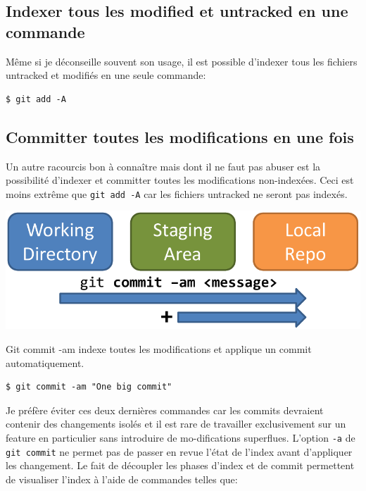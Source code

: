 \documentclass{../../common/tufte-latex/tufte-handout}
\begin{document}
\subsection{Indexer tous les modified et untracked en une commande}

Même si je déconseille souvent son usage, il est possible d'indexer tous les fichiers untracked et modifiés en une seule commande:

\begin{lstlisting}[style=BashInputStyle]
  $ git add -A
\end{lstlisting}

\subsection{Committer toutes les modifications en une fois}

Un autre racourcis bon à connaître mais dont il ne faut pas abuser est la possibilité d'indexer et committer toutes les modifications non-indexées. Ceci est moins extrême que \texttt{git add -A} car les fichiers untracked ne seront pas indexés.

\begin{marginfigure}%
  \centering
  \includegraphics[width=\linewidth]{gitcommit-am-schema.pdf}
  \label{fig:gitcommit-am}
  \caption{Git commit -am indexe toutes les modifications et applique un commit automatiquement.}
\end{marginfigure}
\begin{lstlisting}[style=BashInputStyle]
  $ git commit -am "One big commit"
\end{lstlisting}

Je préfère éviter ces deux dernières commandes car les commits devraient contenir des changements isolés et il est rare de travailler exclusivement sur un feature en particulier sans introduire de mo-difications superflues.
L'option \texttt{-a} de \texttt{git commit} ne permet pas de passer en revue l'état de l'index avant d'appliquer les changement.
Le fait de découpler les phases d'index et de commit permettent de visualiser l'index à l'aide de commandes telles que:
\end{document}
